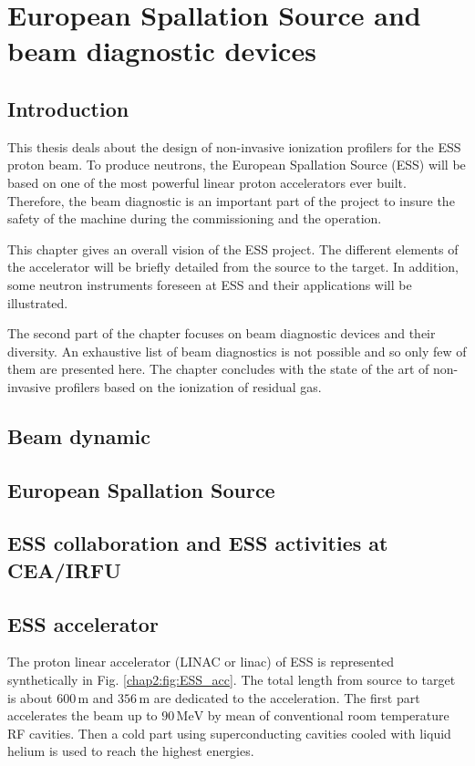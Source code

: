 \chapter{European Spallation Source and beam diagnostic devices}
\cleardoublepage

\minitoc
\section{Introduction}
\begin{refsection}
  \label{ch2:Introduction}
  This thesis deals about the design of non-invasive ionization profilers for the ESS proton beam. To produce neutrons, the European Spallation Source (ESS) will be based on one of the most powerful linear proton accelerators ever built. Therefore, the beam diagnostic is an important part of the project to insure the safety of the machine during the commissioning and the operation.

  This chapter gives an overall vision of the ESS project. The different elements of the accelerator will be briefly detailed from the source to the target. In addition, some neutron instruments foreseen at ESS and their applications will be illustrated.

  The second part of the chapter focuses on beam diagnostic devices and their diversity. An exhaustive list of beam diagnostics is not possible and so only few of them are presented here. The chapter concludes with the state of the art of non-invasive profilers based on the ionization of residual gas.

  \section{Beam dynamic}
  \section{European Spallation Source}
  

  \section{ESS collaboration and ESS activities at CEA/IRFU}



  \section{ESS accelerator}
  The proton linear accelerator (LINAC or linac) of ESS is represented synthetically in Fig. \ref{chap2:fig:ESS_acc}.
  The total length from source to target is about $600\,\mathrm{m}$ and $356\,\mathrm{m}$ are dedicated to the acceleration. The first part accelerates the beam up to $90\,\mathrm{MeV}$ by mean of conventional room temperature RF cavities. Then a cold part using superconducting cavities cooled with liquid helium is used to reach the highest energies.


\end{refsection}
